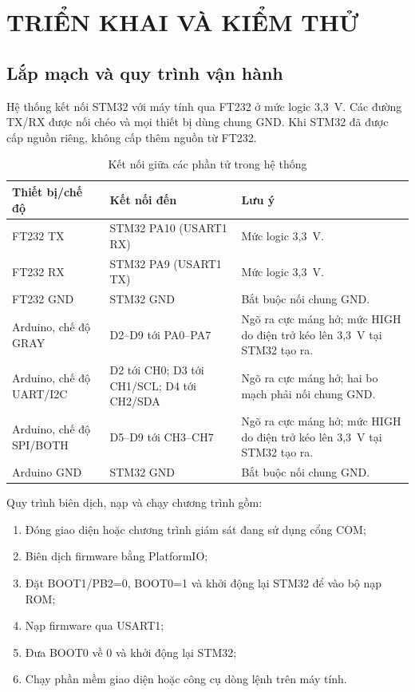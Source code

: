 \chapter{TRIỂN KHAI VÀ KIỂM THỬ}\label{triux1ec3n-khai-vuxe0-kiux1ec3m-thux1eed}

\section{Lắp mạch và quy trình vận hành}\label{sec:deployment}

Hệ thống kết nối STM32 với máy tính qua FT232 ở mức logic 3,3~V. Các đường TX/RX được nối chéo và mọi thiết bị dùng chung GND. Khi STM32 đã được cấp nguồn riêng, không cấp thêm nguồn từ FT232.

\begin{longtable}[]{@{}|
  >{\raggedright\arraybackslash}p{}
  |>{\raggedright\arraybackslash}p{}
  |>{\raggedright\arraybackslash}p{}|@{}}
\caption{Kết nối giữa các phần tử trong hệ thống}\tabularnewline
\hline
\textbf{Thiết bị/chế độ} & \textbf{Kết nối đến} & \textbf{Lưu ý} \\ \hline

FT232 TX & STM32 PA10 (USART1 RX) & Mức logic 3,3~V. \\ \hline
FT232 RX & STM32 PA9 (USART1 TX) & Mức logic 3,3~V. \\ \hline
FT232 GND & STM32 GND & Bắt buộc nối chung GND. \\ \hline
Arduino, chế độ GRAY & D2--D9 tới PA0--PA7 & Ngõ ra cực máng hở; mức HIGH do điện trở kéo lên 3,3~V tại STM32 tạo ra. \\ \hline
Arduino, chế độ UART/I2C & D2 tới CH0; D3 tới CH1/SCL; D4 tới CH2/SDA & Ngõ ra cực máng hở; hai bo mạch phải nối chung GND. \\ \hline
Arduino, chế độ SPI/BOTH & D5--D9 tới CH3--CH7 & Ngõ ra cực máng hở; mức HIGH do điện trở kéo lên 3,3~V tại STM32 tạo ra. \\ \hline
Arduino GND & STM32 GND & Bắt buộc nối chung GND. \\ \hline

\end{longtable}

Quy trình biên dịch, nạp và chạy chương trình gồm:
\begin{enumerate}
\item Đóng giao diện hoặc chương trình giám sát đang sử dụng cổng COM;
\item Biên dịch firmware bằng PlatformIO;
\item Đặt BOOT1/PB2=0, BOOT0=1 và khởi động lại STM32 để vào bộ nạp ROM;
\item Nạp firmware qua USART1;
\item Đưa BOOT0 về 0 và khởi động lại STM32;
\item Chạy phần mềm giao diện hoặc công cụ dòng lệnh trên máy tính.
\end{enumerate}

